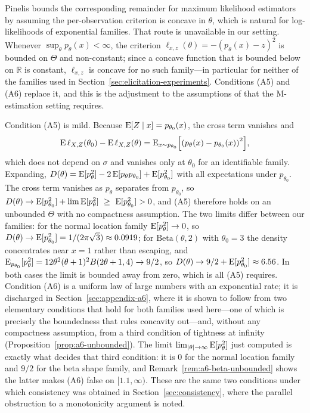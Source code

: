 \begin{remark}
\label{rem:concavity}
Pinelis \cite{Pinelis2017} bounds the corresponding remainder for maximum likelihood estimators by assuming the per-observation criterion is concave in $\theta$, which is natural for log-likelihoods of exponential families. That route is unavailable in our setting. Whenever $\sup_{\theta}p_{\theta}(x)<\infty$, the criterion $\ell_{x,z}(\theta)=-(p_{\theta}(x)-z)^{2}$ is bounded on $\Theta$ and non-constant; since a concave function that is bounded below on $\mathbb{R}$ is constant, $\ell_{x,z}$ is concave for no such family---in particular for neither of the families used in Section~\ref{sec:elicitation-experiments}. Conditions (A5) and (A6) replace it, and this is the adjustment to the assumptions of \cite{Pinelis2017} that the M-estimation setting requires.

Condition (A5) is mild. Because $\mathrm{E}[Z\mid x]=p_{\theta_{0}}(x)$, the cross term vanishes and
$$
\E\,\ell_{X,Z}(\theta_{0})-\E\,\ell_{X,Z}(\theta)=\E_{x\sim p_{\theta_{0}}}\bkt*{\paren*{p_{\theta}(x)-p_{\theta_{0}}(x)}^{2}},
$$
which does not depend on $\sigma$ and vanishes only at $\theta_{0}$ for an identifiable family. Expanding, $D(\theta)=\mathrm{E}[p_{\theta}^{2}]-2\,\mathrm{E}[p_{\theta}p_{\theta_{0}}]+\mathrm{E}[p_{\theta_{0}}^{2}]$ with all expectations under $p_{\theta_{0}}$. The cross term vanishes as $p_{\theta}$ separates from $p_{\theta_{0}}$, so $D(\theta)\to\E[p_{\theta_{0}}^{2}]+\lim\E[p_{\theta}^{2}]\ \ge\ \E[p_{\theta_{0}}^{2}]>0$, and (A5) therefore holds on an unbounded $\Theta$ with no compactness assumption. The two limits differ between our families: for the normal location family $\mathrm{E}[p_{\theta}^{2}]\to0$, so $D(\theta)\to\mathrm{E}[p_{\theta_{0}}^{2}]=1/(2\pi\sqrt{3})\approx0.0919$; for $\mathrm{Beta}(\theta,2)$ with $\theta_{0}=3$ the density concentrates near $x=1$ rather than escaping, and $\mathrm{E}_{p_{\theta_{0}}}[p_{\theta}^{2}]=12\theta^{2}(\theta+1)^{2}B(2\theta+1,4)\to9/2$, so $D(\theta)\to9/2+\mathrm{E}[p_{\theta_{0}}^{2}]\approx6.56$. In both cases the limit is bounded away from zero, which is all (A5) requires. Condition (A6) is a uniform law of large numbers with an exponential rate; it is discharged in Section~\ref{sec:appendix-a6}, where it is shown to follow from two elementary conditions that hold for both families used here---one of which is precisely the boundedness that rules concavity out---and, without any compactness assumption, from a third condition of tightness at infinity (Proposition~\ref{prop:a6-unbounded}). The limit $\lim_{\lvert\theta\rvert\to\infty}\mathrm{E}[p_\theta^2]$ just computed is exactly what decides that third condition: it is $0$ for the normal location family and $9/2$ for the beta shape family, and Remark~\ref{rem:a6-beta-unbounded} shows the latter makes (A6) false on $[1.1,\infty)$. These are the same two conditions under which consistency was obtained in Section~\ref{sec:consistency}, where the parallel obstruction to a monotonicity argument is noted.
\end{remark}

